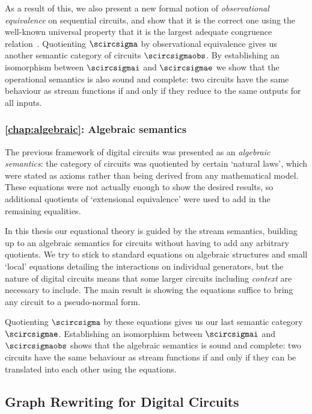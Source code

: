 As a result of this, we also present a new formal notion of
\emph{observational equivalence} on sequential circuits, and show that it is the
correct one using the well-known universal property that it is the largest
adequate congruence relation~\cite{gordon1998operational}.
Quotienting \(\scircsigma\) by observational equivalence gives us another
semantic category of circuits \(\scircsigmaobs\).
By establishing an isomorphism between \(\scircsigmai\) and \(\scircsigmae\)
we show that the operational semantics is also sound and complete: two circuits
have the same behaviour as stream functions if and only if they reduce to the
same outputs for all inputs.

\subsubsection{\cref{chap:algebraic}: Algebraic semantics}

The previous framework of digital circuits was presented as an
\emph{algebraic semantics}: the category of circuits was quotiented by certain
`natural laws', which were stated as axioms rather than being derived from any
mathematical model.
These equations were not actually enough to show the desired results, so
additional quotients of `extensional equivalence' were used to add in the
remaining equalities.

In this thesis our equational theory is guided by the stream semantics,
building up to an algebraic semantics for circuits without having to add any
arbitrary quotients.
We try to stick to standard equations on algebraic structures and small `local'
equations detailing the interactions on individual generators, but the nature of
digital circuits means that some larger circuits including \emph{context} are
necessary to include.
The main result is showing the equations suffice to bring any circuit to a
pseudo-normal form.

Quotienting \(\scircsigma\) by these equations gives us our last semantic
category \(\scircsigmae\).
Establishing an isomorphism between \(\scircsigmai\)
and \(\scircsigmaobs\) shows that the algebraic semantics is sound and complete:
two circuits have the same behaviour as stream functions if and only if they
can be translated into each other using the equations.

\subsection{Graph Rewriting for Digital Circuits}

